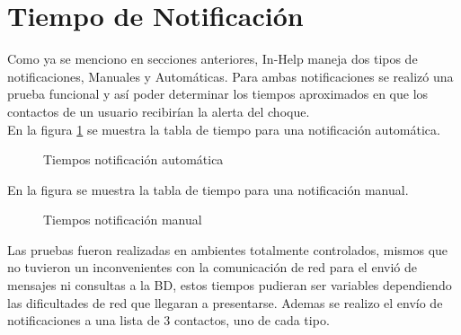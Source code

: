 
\section{Tiempo de Notificación}
Como ya se menciono en secciones anteriores, In-Help maneja dos tipos de notificaciones, Manuales y Automáticas. Para ambas notificaciones se realizó una prueba funcional y así poder determinar los tiempos aproximados en que los contactos de un usuario recibirían la alerta del choque.\\

En la figura \ref{fig:TNA} se muestra la tabla de tiempo para una notificación automática.

\begin{figure}[htbp!]
	\centering
	\caption{Tiempos notificación automática}
	\label{fig:TNA}
\end{figure}

En la figura se muestra la tabla de tiempo para una notificación manual.

\begin{figure}[htbp!]
	\centering
	\caption{Tiempos notificación manual}
	\label{fig:TNM}
\end{figure}

Las pruebas fueron realizadas en ambientes totalmente controlados, mismos que no tuvieron un inconvenientes con la comunicación de red para el envió de mensajes ni consultas a la BD, estos tiempos pudieran ser variables dependiendo las dificultades de red que llegaran a presentarse. Ademas se realizo el envío de notificaciones a una lista de 3 contactos, uno de cada tipo.





 
